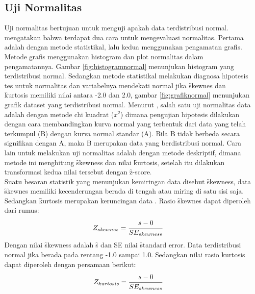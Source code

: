 \subsection{Uji Normalitas}
Uji normalitas bertujuan untuk menguji apakah data terdistribusi normal. \citet{ppt.schwab} mengatakan bahwa terdapat dua cara untuk mengevaluasi normalitas. Pertama adalah dengan metode statistikal, lalu kedua menggunakan pengamatan grafis. Metode grafis menggunakan histogram dan plot normalitas dalam pengamatannya. Gambar \ref{fig:histogramnormal} menunjukan histogram yang terdistribusi normal. Sedangkan metode statistikal melakukan diagnosa hipotesis tes untuk normalitas dan variabelnya mendekati normal jika \f{skewnes} dan \f{kurtosis} memiliki nilai antara -2.0 dan 2.0, gambar \ref{fig:grafiknormal} menunjukan grafik dataset yang terdistribusi normal. Menurut \citet{buku.sugiyono}, salah satu uji normalitas data adalah dengan metode chi kuadrat ($x^2$) dimana pengujian hipotesis dilakukan dengan cara membandingkan kurva normal yang terbentuk dari data yang telah terkumpul (B) dengan kurva normal standar (A). Bila B tidak berbeda secara signifikan dengan A, maka B merupakan data yang berdistribusi normal. Cara lain untuk melakukan uji normalitas adalah dengan metode deskriptif, dimana metode ini menghitung \f{skewness} dan nilai \f{kurtosis}, setelah itu dilakukan transformasi kedua nilai tersebut dengan \f{z-score}. 
\newline\\
Suatu besaran statistik yang menunjukan kemiringan data disebut \f{skewness}, data \f{skewnes} memiliki kecenderungan berada di tengah atau miring di satu sisi saja. Sedangkan \f{kurtosis} merupakan keruncingan data \citep{article.setiawan}. Rasio \f{skewnes} dapat diperoleh dari rumus:
\begin{equation}
\centering
 Z_{skewnes} = \cfrac{s-0}{SE_{skewness}} 
\end{equation}
Dengan nilai \f{skewness} adalah \f{s} dan SE nilai \f{standard error}. Data terdistribusi normal jika berada pada rentang -1.0 sampai 1.0. Sedangkan nilai rasio kurtosis dapat diperoleh dengan persamaan berikut:
\begin{equation}
\centering
Z_{kurtosis} = \cfrac{s-0}{SE_{skewness}} 
\end{equation}

